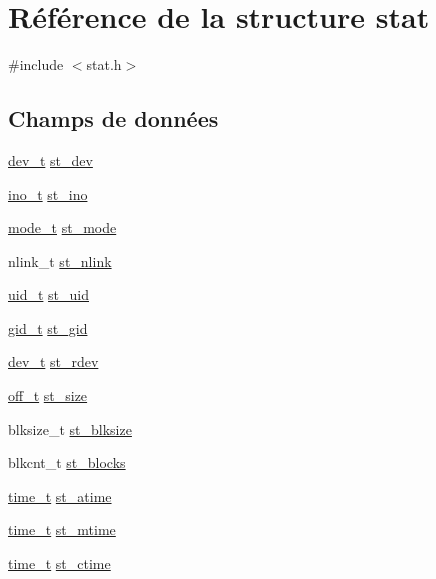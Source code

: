 \hypertarget{structstat}{\section{Référence de la structure stat}
\label{structstat}
}


{\ttfamily \#include $<$stat.\-h$>$}

\subsection*{Champs de données}
\begin{DoxyCompactItemize}
\item 
\hyperlink{stat_8h_a451f1b5788fa7cc5d33db47a5992e7a6}{dev\-\_\-t} \hyperlink{structstat_ac5b90090ae323741ae4c9e4f3683a29f}{st\-\_\-dev}
\item 
\hyperlink{stat_8h_aed4e918b44240739869c4bdb1c4787a9}{ino\-\_\-t} \hyperlink{structstat_a9769ed8f0d4c5a9f329c32bc92479d56}{st\-\_\-ino}
\item 
\hyperlink{stat_8h_af8f4385bb42836d1e3ad4fea9d71d1b9}{mode\-\_\-t} \hyperlink{structstat_a5cbdd829011af82ba61e83773bbcbc7d}{st\-\_\-mode}
\item 
nlink\-\_\-t \hyperlink{structstat_a0ed9092fa6c77a3251b9b9a4738ef84f}{st\-\_\-nlink}
\item 
\hyperlink{stat_8h_af2306308627701b66dc6f3babe821ab4}{uid\-\_\-t} \hyperlink{structstat_a4a8708a3d18be60ee7b2f06c4cab0c70}{st\-\_\-uid}
\item 
\hyperlink{stat_8h_aa7352f1065fe606194d792e2b292cf83}{gid\-\_\-t} \hyperlink{structstat_ab864f16f436cec370f0ced585d897698}{st\-\_\-gid}
\item 
\hyperlink{stat_8h_a451f1b5788fa7cc5d33db47a5992e7a6}{dev\-\_\-t} \hyperlink{structstat_aa61e6c1a8a91c69f1d26f6700a0546cb}{st\-\_\-rdev}
\item 
\hyperlink{types_8h_a447a6a64dbb8fb44b1e62856b333db4a}{off\-\_\-t} \hyperlink{structstat_a040e19c8b9766f841fde8786ce9297bf}{st\-\_\-size}
\item 
blksize\-\_\-t \hyperlink{structstat_a38d474e1ae3cf6fbdde89ac3c3e308f1}{st\-\_\-blksize}
\item 
blkcnt\-\_\-t \hyperlink{structstat_a42dd716b2f9234f961d949fc9500eefb}{st\-\_\-blocks}
\item 
\hyperlink{time_8h_aaaf414ca0598a3633e6e9161cbb5a58a}{time\-\_\-t} \hyperlink{structstat_ab74d1e7e345e88b9d0fb2688a97cba64}{st\-\_\-atime}
\item 
\hyperlink{time_8h_aaaf414ca0598a3633e6e9161cbb5a58a}{time\-\_\-t} \hyperlink{structstat_a77e235090f8cb6897f1c0ce65689006b}{st\-\_\-mtime}
\item 
\hyperlink{time_8h_aaaf414ca0598a3633e6e9161cbb5a58a}{time\-\_\-t} \hyperlink{structstat_a1b4b858db1ebe79c3d6e0fc1ef721024}{st\-\_\-ctime}
\end{DoxyCompactItemize}


